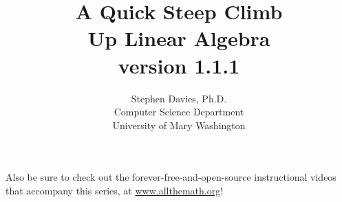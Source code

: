 \documentclass[11pt]{memoir}
\begin{document}
\title{A Quick Steep Climb\\Up Linear Algebra\\{\small version 1.1.1}}
\author{Stephen Davies, Ph.D.\\Computer Science Department\\University of Mary Washington}
\date{}
\maketitle


\frontmatter

\pagebreak

\renewcommand{\contentsname}{Contents at a glance}
\setcounter{tocdepth}{0}
\tableofcontents

\vspace{.6in}
\begin{center}
\small
Also be sure to check out the forever-free-and-open-source instructional videos
that accompany this series, at \url{www.allthemath.org}!
\end{center}




\mainmatter










\backmatter
\printindex

\end{document}
